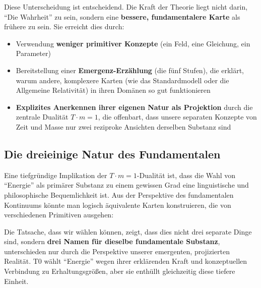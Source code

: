 	Diese Unterscheidung ist entscheidend. Die Kraft der Theorie liegt nicht darin, \enquote{Die Wahrheit} zu sein, sondern eine \textbf{bessere, fundamentalere Karte} als frühere zu sein. Sie erreicht dies durch:
	\begin{itemize}
		\item Verwendung \textbf{weniger primitiver Konzepte} (ein Feld, eine Gleichung, ein Parameter)
		\item Bereitstellung einer \textbf{Emergenz-Erzählung} (die fünf Stufen), die erklärt, warum andere, komplexere Karten (wie das Standardmodell oder die Allgemeine Relativität) in ihren Domänen so gut funktionieren
		\item \textbf{Explizites Anerkennen ihrer eigenen Natur als Projektion} durch die zentrale Dualität $T \cdot m = 1$, die offenbart, dass unsere separaten Konzepte von Zeit und Masse nur zwei reziproke Ansichten derselben Substanz sind
	\end{itemize}

	\subsection{Die dreieinige Natur des Fundamentalen}

	Eine tiefgründige Implikation der $T \cdot m = 1$-Dualität ist, dass die Wahl von \enquote{Energie} als primärer Substanz zu einem gewissen Grad eine linguistische und philosophische Bequemlichkeit ist. Aus der Perspektive des fundamentalen Kontinuums könnte man logisch äquivalente Karten konstruieren, die von verschiedenen Primitiven ausgehen:

	\begin{center}
	\end{center}

	Die Tatsache, dass wir wählen können, zeigt, dass dies nicht drei separate Dinge sind, sondern \textbf{drei Namen für dieselbe fundamentale Substanz}, unterschieden nur durch die Perspektive unserer emergenten, projizierten Realität. T0 wählt \enquote{Energie} wegen ihrer erklärenden Kraft und konzeptuellen Verbindung zu Erhaltungsgrößen, aber sie enthüllt gleichzeitig diese tiefere Einheit.

